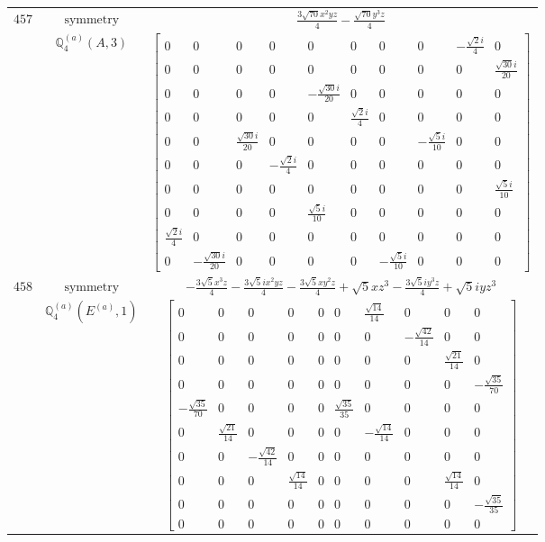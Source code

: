 \documentclass[fleqn,8pt,landscape]{jsarticle}
\begin{document}
\begin{longtable}{ccc}
$ 457 $ & $ \text{symmetry} $ & $ \frac{3 \sqrt{70} x^{2} y z}{4} - \frac{\sqrt{70} y^{3} z}{4} $ \\
$  $ & $ \mathbb{Q}_{4}^{(a)}(A,3) $ & $ \begin{bmatrix} 0 & 0 & 0 & 0 & 0 & 0 & 0 & 0 & - \frac{\sqrt{2} i}{4} & 0 \\ 0 & 0 & 0 & 0 & 0 & 0 & 0 & 0 & 0 & \frac{\sqrt{30} i}{20} \\ 0 & 0 & 0 & 0 & - \frac{\sqrt{30} i}{20} & 0 & 0 & 0 & 0 & 0 \\ 0 & 0 & 0 & 0 & 0 & \frac{\sqrt{2} i}{4} & 0 & 0 & 0 & 0 \\ 0 & 0 & \frac{\sqrt{30} i}{20} & 0 & 0 & 0 & 0 & - \frac{\sqrt{5} i}{10} & 0 & 0 \\ 0 & 0 & 0 & - \frac{\sqrt{2} i}{4} & 0 & 0 & 0 & 0 & 0 & 0 \\ 0 & 0 & 0 & 0 & 0 & 0 & 0 & 0 & 0 & \frac{\sqrt{5} i}{10} \\ 0 & 0 & 0 & 0 & \frac{\sqrt{5} i}{10} & 0 & 0 & 0 & 0 & 0 \\ \frac{\sqrt{2} i}{4} & 0 & 0 & 0 & 0 & 0 & 0 & 0 & 0 & 0 \\ 0 & - \frac{\sqrt{30} i}{20} & 0 & 0 & 0 & 0 & - \frac{\sqrt{5} i}{10} & 0 & 0 & 0 \end{bmatrix} $ \\ \hline
$ 458 $ & $ \text{symmetry} $ & $ - \frac{3 \sqrt{5} x^{3} z}{4} - \frac{3 \sqrt{5} i x^{2} y z}{4} - \frac{3 \sqrt{5} x y^{2} z}{4} + \sqrt{5} x z^{3} - \frac{3 \sqrt{5} i y^{3} z}{4} + \sqrt{5} i y z^{3} $ \\
$  $ & $ \mathbb{Q}_{4}^{(a)}(E^{(a)},1) $ & $ \begin{bmatrix} 0 & 0 & 0 & 0 & 0 & 0 & \frac{\sqrt{14}}{14} & 0 & 0 & 0 \\ 0 & 0 & 0 & 0 & 0 & 0 & 0 & - \frac{\sqrt{42}}{14} & 0 & 0 \\ 0 & 0 & 0 & 0 & 0 & 0 & 0 & 0 & \frac{\sqrt{21}}{14} & 0 \\ 0 & 0 & 0 & 0 & 0 & 0 & 0 & 0 & 0 & - \frac{\sqrt{35}}{70} \\ - \frac{\sqrt{35}}{70} & 0 & 0 & 0 & 0 & \frac{\sqrt{35}}{35} & 0 & 0 & 0 & 0 \\ 0 & \frac{\sqrt{21}}{14} & 0 & 0 & 0 & 0 & - \frac{\sqrt{14}}{14} & 0 & 0 & 0 \\ 0 & 0 & - \frac{\sqrt{42}}{14} & 0 & 0 & 0 & 0 & 0 & 0 & 0 \\ 0 & 0 & 0 & \frac{\sqrt{14}}{14} & 0 & 0 & 0 & 0 & \frac{\sqrt{14}}{14} & 0 \\ 0 & 0 & 0 & 0 & 0 & 0 & 0 & 0 & 0 & - \frac{\sqrt{35}}{35} \\ 0 & 0 & 0 & 0 & 0 & 0 & 0 & 0 & 0 & 0 \end{bmatrix} $ \\ \hline

\end{longtable}
\end{document}
